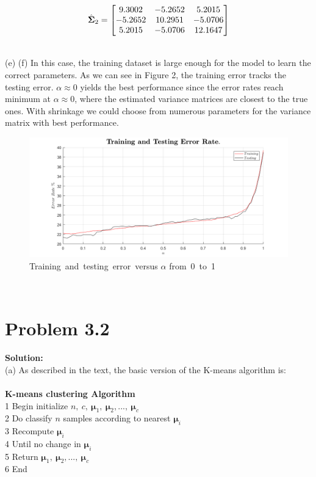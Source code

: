 \documentclass[12pt]{article}
\begin{document}
\begin{equation*}
\begin{aligned}
\centering {\begin{matrix}
\hat{\bm{\Sigma}}_2  = \begin{bmatrix}
    9.3002  & -5.2652  &  5.2015 \\
   -5.2652  & 10.2951  & -5.0706 \\
    5.2015  & -5.0706  & 12.1647
\end{bmatrix}
\end{matrix}}
\end{aligned}
\end{equation*}

\vfill
\clearpage
\noindent\\(e) (f) In this case, the training dataset is large enough for the model to learn the correct parameters. As we can see in Figure 2, the training error tracks the testing error. $\alpha \approx 0$ yields the best performance since the error rates reach minimum at $\alpha \approx 0$, where the estimated variance matrices are closest to the true ones. With shrinkage we could choose from numerous parameters for the variance matrix with best performance.\\
\begin{figure}[H]
\centering
\includegraphics[width = 1\textwidth]{1ef.png}
\caption{Training\ and\ testing\ error\ versus $\alpha$ from\ 0\ to\ 1}
\end{figure}
\text{ }\\
\section{Problem 3.2}
\large{\textbf{Solution:}}\\
(a) As described in the text, the basic version of the K-means algorithm is:\\
\\
\textbf{K-means clustering Algorithm}\\
1 Begin initialize $n,\ c,\ \bm{\mu}_1,\ \bm{\mu}_2,...,\ \bm{\mu}_c$\\
2 Do classify $n$ samples according to nearest $\bm{\mu}_i$\\
3 Recompute $\bm{\mu}_i$\\
4 Until no change in $\bm{\mu}_i$\\
5 Return $\bm{\mu}_1,\ \bm{\mu}_2,...,\ \bm{\mu}_c$\\
6 End\\
\vfill
\clearpage
\end{document}
